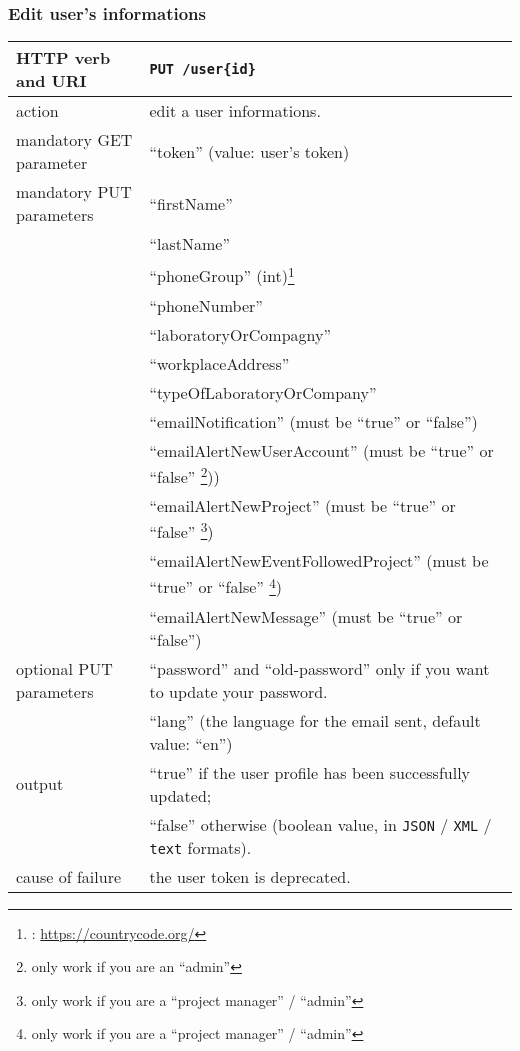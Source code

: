 \subsubsection{Edit user's informations}
\label{putUsersInformations}
\begin{tabular}{ | l | l | }
	\hline
	HTTP verb and URI & \texttt{PUT /user\{id\}} \\
	\hline
	action & edit a user informations. \\
	\hline
	mandatory GET parameter & ``token'' (value: user's token) \\
	\hline
	mandatory PUT parameters & ``firstName'' \\
	\space & ``lastName''  \\
	\space & ``phoneGroup'' (int)\footnote{\cf: \url{https://countrycode.org/}} \\
	\space & ``phoneNumber'' \\
	\space & ``laboratoryOrCompagny'' \\
	\space & ``workplaceAddress'' \\
	\space & ``typeOfLaboratoryOrCompany'' \\	
	\space & ``emailNotification'' (must be ``true'' or ``false'') \\
	\space & ``emailAlertNewUserAccount'' (must be ``true'' or ``false'' \footnote{only work if you are an ``admin''})) \\
	\space & ``emailAlertNewProject'' (must be ``true'' or ``false'' \footnote{only work if you are a ``project manager'' / ``admin''}) \\
	\space & ``emailAlertNewEventFollowedProject'' (must be ``true'' or ``false'' \footnote{only work if you are a ``project manager'' / ``admin''}) \\
	\space & ``emailAlertNewMessage'' (must be ``true'' or ``false'') \\	
	\hline
	optional PUT parameters & ``password'' and ``old-password'' only if you want to update your password. \\
	\space & ``lang'' (the language for the email sent, default value: ``en'') \\	
	\hline
	output & ``true'' if the user profile has been successfully updated; \\
	\space & ``false'' otherwise (boolean value, in \texttt{JSON} / \texttt{XML} / \texttt{text} formats). \\
	\hline
	cause of failure & the user token is deprecated. \\
	\hline
\end{tabular}
\newline

